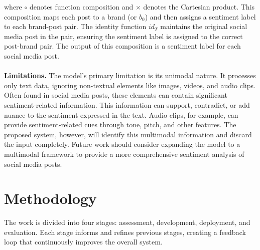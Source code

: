 \documentclass{article}
\begin{document}
where $\circ$ denotes function composition and $\times$ denotes the Cartesian
product. This composition maps each post to a brand (or $b_0$) and then assigns
a sentiment label to each brand-post pair. The identity function $id_T$
maintains the original social media post in the pair, ensuring the sentiment
label is assigned to the correct post-brand pair. The output of this
composition is a sentiment label for each social media post.\\
\\
\textbf{Limitations.} The model's primary limitation is its unimodal nature. It
processes only text data, ignoring non-textual elements like images, videos,
and audio clips. Often found in social media posts, these elements can contain
significant sentiment-related information. This information can support,
contradict, or add nuance to the sentiment expressed in the text. Audio clips,
for example, can provide sentiment-related cues through tone, pitch, and other
features. The proposed system, however, will identify this multimodal
information and discard the input completely. Future work should consider
expanding the model to a multimodal framework to provide a more comprehensive
sentiment analysis of social media posts.

\section{Methodology}

The work is divided into four stages: assessment, development, deployment, and
evaluation. Each stage informs and refines previous stages, creating a feedback
loop that continuously improves the overall system.
\end{document}
